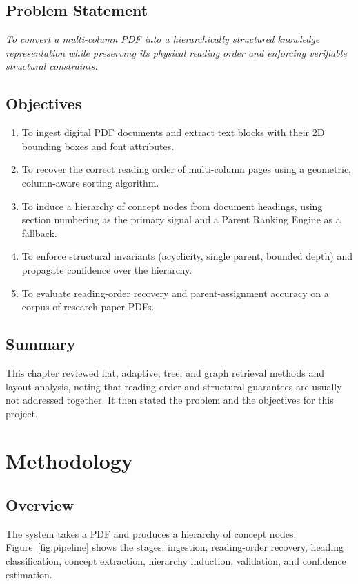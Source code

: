 \documentclass[12pt,a4paper]{report}
\begin{document}
\section{Problem Statement}
\textit{To convert a multi-column PDF into a hierarchically structured knowledge
representation while preserving its physical reading order and enforcing verifiable
structural constraints.}

\section{Objectives}
\begin{enumerate}
  \item To ingest digital PDF documents and extract text blocks with their 2D
  bounding boxes and font attributes.
  \item To recover the correct reading order of multi-column pages using a geometric,
  column-aware sorting algorithm.
  \item To induce a hierarchy of concept nodes from document headings, using section
  numbering as the primary signal and a Parent Ranking Engine as a fallback.
  \item To enforce structural invariants (acyclicity, single parent, bounded depth) and
  propagate confidence over the hierarchy.
  \item To evaluate reading-order recovery and parent-assignment accuracy on a corpus
  of research-paper PDFs.
\end{enumerate}

\section{Summary}
This chapter reviewed flat, adaptive, tree, and graph retrieval methods and layout
analysis, noting that reading order and structural guarantees are usually not addressed
together. It then stated the problem and the objectives for this project.

\chapter{Methodology}

\section{Overview}
The system takes a PDF and produces a hierarchy of concept nodes. Figure~\ref{fig:pipeline}
shows the stages: ingestion, reading-order recovery, heading classification, concept
extraction, hierarchy induction, validation, and confidence estimation.
\end{document}
